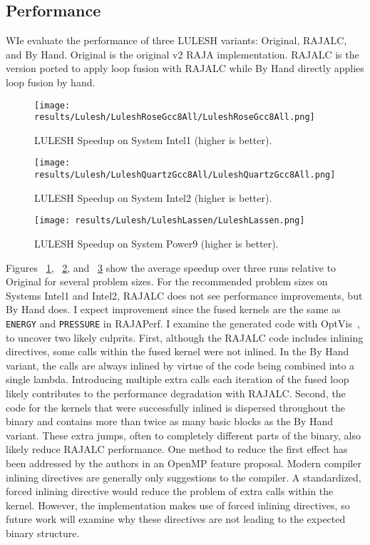 \subsection{Performance}

WIe evaluate the performance of three LULESH variants: Original, RAJALC, and
By Hand.
Original is the original v2 RAJA implementation.
RAJALC is the version ported to apply loop fusion with RAJALC while By Hand
directly applies loop fusion by hand.


\begin{figure}[t]
\texttt{[image: results/Lulesh/LuleshRoseGcc8All/LuleshRoseGcc8All.png]}

\caption{LULESH Speedup on System Intel1 (higher is better).}
\label{LULESHRose}
\end{figure}

\begin{figure}[t]
\texttt{[image: results/Lulesh/LuleshQuartzGcc8All/LuleshQuartzGcc8All.png]}
\caption{LULESH Speedup on System Intel2 (higher is better).}
\label{LULESHQuartz}
\end{figure}

\begin{figure}[t]
\texttt{[image: results/Lulesh/LuleshLassen/LuleshLassen.png]}
\caption{LULESH Speedup on System Power9 (higher is better).}
\label{LULESHLassen}
\end{figure}

Figures ~\ref{LULESHRose}, ~\ref{LULESHQuartz}, and ~\ref{LULESHLassen} show
the average speedup over three runs relative to Original for several problem
sizes. 
For the recommended problem sizes on Systems Intel1 and Intel2, RAJALC does
not see performance improvements, but By Hand does.
I expect improvement since the fused kernels are the same as \verb.ENERGY.
and \verb.PRESSURE. in RAJAPerf.
I examine the generated code with OptVis~\cite{devkota2020ccnav}, to uncover
two likely culprits.
First, although the RAJALC code includes inlining directives, some calls
within the fused kernel were not inlined. 
In the By Hand variant, the calls are always inlined by virtue of the code
being combined into a single lambda. 
Introducing multiple extra calls each iteration of the fused loop likely
contributes to the performance degradation with RAJALC.
Second, the code for the kernels that were successfully inlined is dispersed
throughout the binary and contains more than twice as many basic blocks as
the By Hand variant. 
These extra jumps, often to completely different parts of the binary, also
likely reduce RAJALC performance. 
One method to reduce the first effect has been addressed by the authors 
in an OpenMP feature proposal. Modern compiler inlining directives are generally 
only suggestions to the compiler. A standardized, forced inlining directive would 
reduce the problem of extra calls within the kernel.
However, the implementation makes use of forced inlining directives, 
so future work will examine why these directives are not leading to the expected binary structure.


